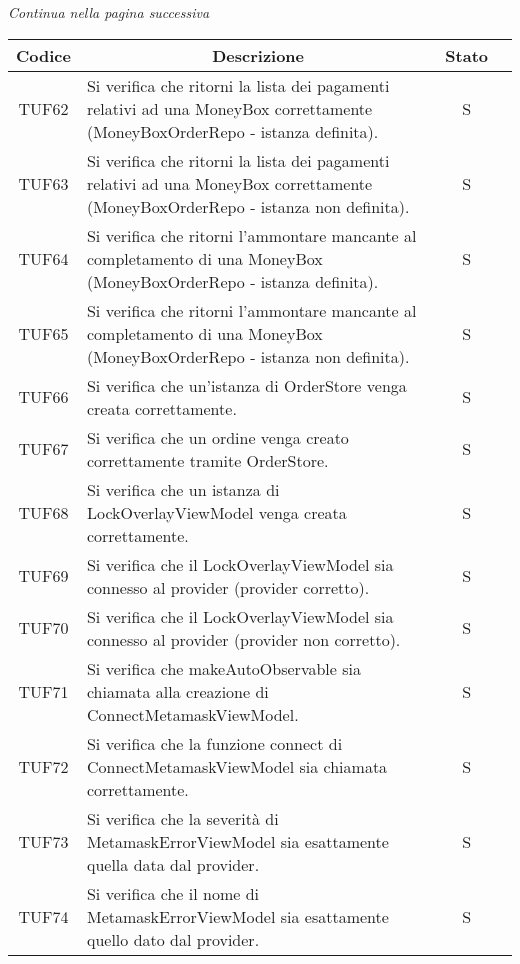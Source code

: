 \begin{center}
  \textit{\small Continua nella pagina successiva}
\end{center}
\begin{table}[H]
  \centering
  \renewcommand{\arraystretch}{1.8}
  \begin{tabular}{c|p{8cm}|c|c}
    \rowcolor[HTML]{125E28}
    \color[HTML]{FFFFFF}\textbf{Codice}
          & \multicolumn{1}{c}{\color[HTML]{FFFFFF}\textbf{Descrizione}}
          & \color[HTML]{FFFFFF}\textbf{Stato}                                                                                                          \\
    \hline
    TUF62 & Si verifica che ritorni la lista dei pagamenti relativi ad una MoneyBox\glo{} correttamente (MoneyBoxOrderRepo - istanza definita).     & S \\
    TUF63 & Si verifica che ritorni la lista dei pagamenti relativi ad una MoneyBox\glo{} correttamente (MoneyBoxOrderRepo - istanza non definita). & S \\
    TUF64 & Si verifica che ritorni l'ammontare mancante al completamento di una MoneyBox\glo{} (MoneyBoxOrderRepo - istanza definita).             & S \\
    TUF65 & Si verifica che ritorni l'ammontare mancante al completamento di una MoneyBox\glo{} (MoneyBoxOrderRepo - istanza non definita).         & S \\
    TUF66 & Si verifica che un'istanza di OrderStore venga creata correttamente.                                                                    & S \\
    TUF67 & Si verifica che un ordine venga creato correttamente tramite OrderStore.                                                                & S \\
    TUF68 & Si verifica che un istanza di LockOverlayViewModel venga creata correttamente.                                                          & S \\
    TUF69 & Si verifica che il LockOverlayViewModel sia connesso al provider (provider corretto).                                                   & S \\
    TUF70 & Si verifica che il LockOverlayViewModel sia connesso al provider (provider non corretto).                                               & S \\
    TUF71 & Si verifica che makeAutoObservable sia chiamata alla creazione di ConnectMetamaskViewModel.                                             & S \\
    TUF72 & Si verifica che la funzione connect di ConnectMetamaskViewModel sia chiamata correttamente.                                             & S \\
    TUF73 & Si verifica che la severità di MetamaskErrorViewModel sia esattamente quella data dal provider.                                         & S \\
    TUF74 & Si verifica che il nome di MetamaskErrorViewModel sia esattamente quello dato dal provider.                                             & S \\
  \end{tabular}
\end{table}
